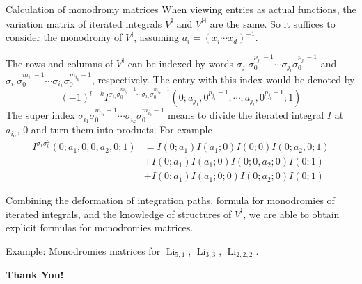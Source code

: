\documentclass[8pt]{beamer}
\DeclareMathOperator{\Li}{Li}
\theoremstyle{definition}
\theoremstyle{remark}
\begin{document}
\begin{frame}[t]{Calculation of monodromy matrices}
When viewing entries as actual functions, the variation matrix of iterated integrals $V^{\mathbb I}$ and $V^{\overline{\mathbb H}}$ are the same. So it suffices to consider the monodromy of $V^{\mathbb I}$, assuming $a_i=(x_i\cdots x_d)^{-1}$.
\vspace{10pt}

The rows and columns of $V^{\mathbb I}$ can be indexed by words $\sigma_{j_1}\sigma_0^{p_{j_1}-1}\cdots\sigma_{j_l}\sigma_0^{p_{j_l}-1}$ and $\sigma_{i_1}\sigma_0^{m_{i_1}-1}\cdots\sigma_{i_k}\sigma_0^{m_{i_k}-1}$, respectively. The entry with this index would be denoted by
\[
(-1)^{l-k}I^{\sigma_{i_1}\sigma_0^{m_{i_1}-1}\cdots\sigma_{i_k}\sigma_0^{m_{i_k}-1}}(0;a_{j_1},0^{p_{j_1}-1},\cdots,a_{j_l},0^{p_{j_l}-1};1)
\]
The super index $\sigma_{i_1}\sigma_0^{m_{i_1}-1}\cdots\sigma_{i_k}\sigma_0^{m_{i_k}-1}$ means to divide the iterated integral $I$ at $a_{i_\alpha}$, $0$ and turn them into products. For example
\begin{align*}
I^{\sigma_1\sigma_0^2}(0;a_1,0,0,a_2,0;1)&=I(0;a_1)I(a_1;0)I(0;0)I(0;a_2,0;1)\\
&+I(0;a_1)I(a_1;0)I(0;0,a_2;0)I(0;1)\\
&+I(0;a_1)I(a_1;0;0)I(0;a_2;0)I(0;1)
\end{align*}
\vspace{10pt}

Combining the deformation of integration paths, formula for monodromies of iterated integrals, and the knowledge of structures of $V^{\mathbb I}$, we are able to obtain explicit formulas for monodromies matrices.
\vspace{10pt}

Example: Monodromies matrices for $\Li_{5,1}$, $\Li_{3,3}$, $\Li_{2,2,2}$.
\end{frame}

\begin{frame}[plain]
\centering
\Huge{\textbf{Thank You!}}
\end{frame}

\end{document}
